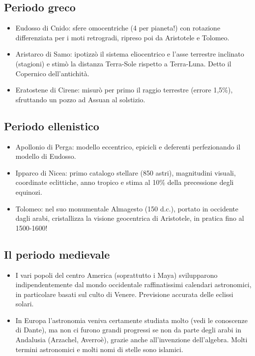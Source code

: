 \documentclass[a4paper, oneside]{book}
\begin{document}
\subsection{Periodo greco}
\begin{itemize}
    \item Eudosso di Cnido: sfere omocentriche (4 per pianeta!) con
rotazione differenziata per i moti retrogradi, ripreso poi da
Aristotele e Tolomeo.
 \item  Aristarco di Samo: ipotizzò il sistema eliocentrico e l’asse
terrestre inclinato (stagioni) e stimò la distanza Terra-Sole
rispetto a Terra-Luna. Detto il Copernico dell’antichità.
 \item Eratostene di Cirene: misurò per primo il raggio terrestre
(errore 1,5\%), sfruttando un pozzo ad Assuan al solstizio.
\end{itemize}
\subsection{Periodo ellenistico}
\begin{itemize}
    \item Apollonio di Perga: modello eccentrico, epicicli e
deferenti perfezionando il modello di Eudosso.
\item Ipparco di Nicea: primo catalogo stellare (850 astri),
magnitudini visuali, coordinate eclittiche, anno tropico
e stima al 10\% della precessione degli equinozi.
\item Tolomeo: nel suo monumentale Almagesto (150 d.c.),
portato in occidente dagli arabi, cristallizza la visione
geocentrica di Aristotele, in pratica fino al 1500-1600!
\end{itemize}
\subsection{Il periodo medievale}
\begin{itemize}
    \item I vari popoli del centro America
(soprattutto i Maya) svilupparono
indipendentemente dal mondo
occidentale raffinatissimi calendari
astronomici, in particolare basati
sul culto di Venere. Previsione
accurata delle eclissi solari.
\item  In Europa l’astronomia veniva
certamente studiata molto (vedi
le conoscenze di Dante), ma non
ci furono grandi progressi se non
da parte degli arabi in Andalusia
(Arzachel, Averroè), grazie anche
all’invenzione dell’algebra. Molti
termini astronomici e molti nomi
di stelle sono islamici.
\end{itemize}
\end{document}
